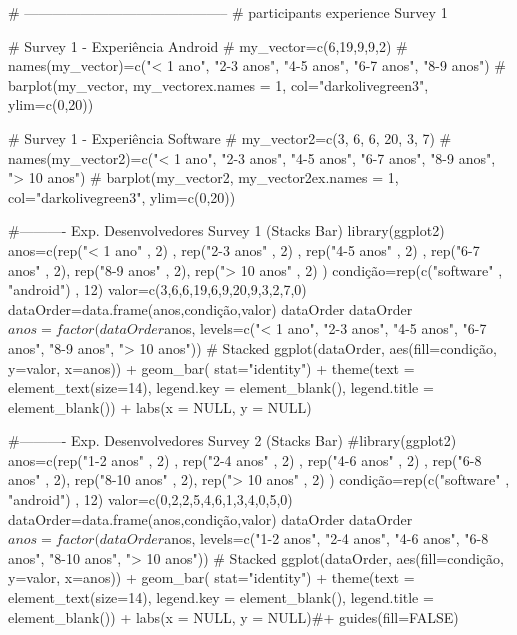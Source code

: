 # --------------------------------------------
# participants experience Survey 1

# Survey 1 - Experiência Android 
# my_vector=c(6,19,9,9,2)
# names(my_vector)=c("< 1 ano", "2-3 anos", "4-5 anos", "6-7 anos", "8-9 anos")
# barplot(my_vector, my_vectorex.names = 1, col="darkolivegreen3", ylim=c(0,20))

# Survey 1 - Experiência Software
# my_vector2=c(3, 6, 6, 20, 3, 7)
# names(my_vector2)=c("< 1 ano", "2-3 anos", "4-5 anos", "6-7 anos", "8-9 anos", "> 10 anos")
# barplot(my_vector2, my_vector2ex.names = 1, col="darkolivegreen3", ylim=c(0,20))


#---------- Exp. Desenvolvedores Survey 1 (Stacks Bar)
library(ggplot2)
anos=c(rep("< 1 ano" , 2) , rep("2-3 anos" , 2) , rep("4-5 anos" , 2) , rep("6-7 anos" , 2), rep("8-9 anos" , 2), rep("> 10 anos" , 2) )
condição=rep(c("software" , "android") , 12)
valor=c(3,6,6,19,6,9,20,9,3,2,7,0)
dataOrder=data.frame(anos,condição,valor)
dataOrder
dataOrder$anos = factor(dataOrder$anos, levels=c("< 1 ano", "2-3 anos", "4-5 anos", "6-7 anos", "8-9 anos", "> 10 anos"))
# Stacked
ggplot(dataOrder, aes(fill=condição, y=valor, x=anos)) + geom_bar( stat="identity") + theme(text = element_text(size=14), legend.key = element_blank(), legend.title = element_blank()) + labs(x = NULL, y = NULL)


#---------- Exp. Desenvolvedores Survey 2 (Stacks Bar)
#library(ggplot2)
anos=c(rep("1-2 anos" , 2) , rep("2-4 anos" , 2) , rep("4-6 anos" , 2) , rep("6-8 anos" , 2), rep("8-10 anos" , 2), rep("> 10 anos" , 2) )
condição=rep(c("software" , "android") , 12)
valor=c(0,2,2,5,4,6,1,3,4,0,5,0)
dataOrder=data.frame(anos,condição,valor)
dataOrder
dataOrder$anos = factor(dataOrder$anos, levels=c("1-2 anos", "2-4 anos", "4-6 anos", "6-8 anos", "8-10 anos", "> 10 anos"))
# Stacked
ggplot(dataOrder, aes(fill=condição, y=valor, x=anos)) + geom_bar( stat="identity") + theme(text = element_text(size=14), legend.key = element_blank(), legend.title = element_blank()) + labs(x = NULL, y = NULL)#+ guides(fill=FALSE)


